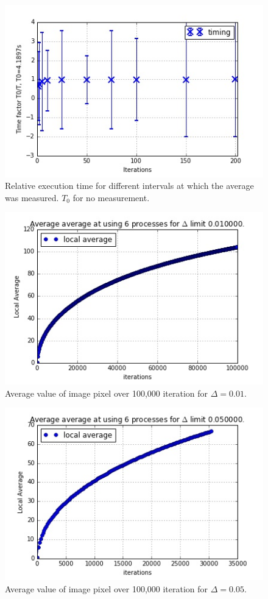 \documentclass[11pt]{article}
\begin{document}
	
	\begin{figure}[H]	
		\centering
		\includegraphics[scale=0.5]{itervs5.jpeg}
		\caption{Relative execution time for different intervals at which the average was measured. $T_0$ for no measurement.}\label{iter5}
	\end{figure}

	
	\begin{figure}[H]	
		\centering
		\includegraphics[scale=0.5]{local_avg_6_010000.jpeg}
		\caption{Average value of image pixel over 100,000 iteration for $\Delta=0.01$.}\label{avg1}
	\end{figure}

	
	\begin{figure}[H]	
		\centering
		\includegraphics[scale=0.5]{local_avg_6_050000.jpeg}
		\caption{Average value of image pixel over 100,000 iteration for $\Delta=0.05$.}\label{avg2}
	\end{figure}
\end{document}
